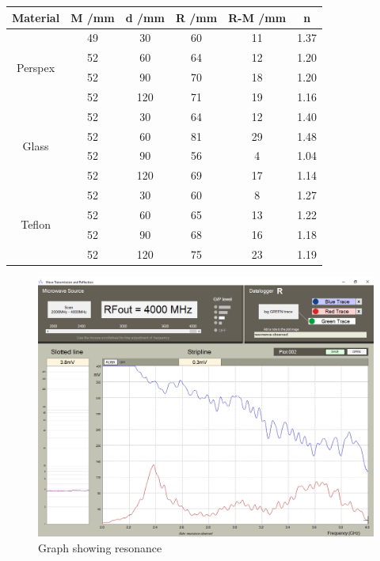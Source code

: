 \documentclass[12pt]{article}
\begin{document}
\begin{center}
    \begin{tabular}{|c|c|c|c|c|c|}
    \hline
    Material & M /mm & d /mm & R /mm & R-M /mm & n \\
    \hline  
    \multirow{4}{*}{Perspex}& 49	& 30	& 60	& 11	& 1.37 \\
        	                & 52	& 60	& 64	& 12	& 1.20 \\
        	                & 52	& 90	& 70	& 18	& 1.20 \\
        	                & 52	& 120	& 71	& 19	& 1.16 \\
    \hline
    \multirow{4}{*}{Glass}	& 52	& 30	& 64	& 12	& 1.40 \\
        	                & 52	& 60	& 81	& 29	& 1.48 \\
        	                & 52	& 90	& 56	& 4	    & 1.04 \\
        	                & 52	& 120	& 69	& 17	& 1.14 \\
    \hline
    \multirow{4}{*}{Teflon}	& 52	& 30	& 60	& 8	    & 1.27 \\
                        	& 52	& 60	& 65	& 13	& 1.22 \\
                        	& 52	& 90	& 68	& 16	& 1.18 \\
                        	& 52	& 120	& 75	& 23	& 1.19 \\
    \hline
    \end{tabular}
\end{center}

\begin{figure}[h]
    \centering
    \includegraphics[width=1\textwidth]{Plot_2.png}
    \caption{Graph showing resonance}
    \label{fig:phase_space}
\end{figure}
\end{document}
